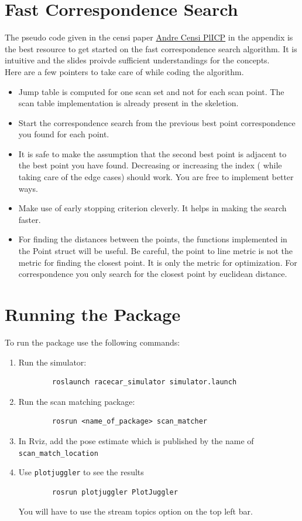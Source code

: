\documentclass[letta4 paper]{article}
\numberwithin{equation}{section}
\newcommand{\0}{\mathbf{0}}
\begin{document}
	\section{Fast Correspondence Search}
	The pseudo code given in the censi paper \href{https://d1b10bmlvqabco.cloudfront.net/attach/jzp1ehpfdij7ot/jle03wepvgi3j6/k0snhjhdvfrs/2008icraplicp1.pdf}{Andre Censi PlICP} in the appendix is the best resource to get started on the fast correspondence search algorithm. It is intuitive and the slides proivde sufficient understandings for the concepts.\\
	Here are a few pointers to take care of while coding the algorithm.
	\begin{itemize}
		\item Jump table is computed for one scan set and not for each scan point. The scan table implementation is already present in the skeletion.
		\item Start the correspondence search from the previous best point correspondence you found for each point.
		\item It is safe to make the assumption that the second best point is adjacent to the best point you have found. Decreasing or increasing the index ( while taking care of the edge cases) should work. You are free to implement better ways.
		\item Make use of early stopping criterion cleverly. It helps in making the search faster.
		\item For finding the distances between the points, the functions implemented in the Point struct will be useful. Be careful, the point to line metric is not the metric for finding the closest point. It is only the metric for optimization. For correspondence you only search for the closest point by euclidean distance.
	\end{itemize}
	
	\section{Running the Package}
	To run the package use the following commands:
	\begin{enumerate}
		\item Run the simulator:
		\begin{verbatim}
		roslaunch racecar_simulator simulator.launch    
		\end{verbatim}
		\item Run the scan matching package: 
		\begin{verbatim}
		rosrun <name_of_package> scan_matcher 
		\end{verbatim}
		\item In Rviz, add the pose estimate which is published by the name of \texttt{scan\_match\_location} 
		\item Use \texttt{plotjuggler} to see the results 
		\begin{verbatim}
		rosrun plotjuggler PlotJuggler
		\end{verbatim}
		You will have to use the stream topics option on the top left bar. 
	\end{enumerate}
\end{document}
